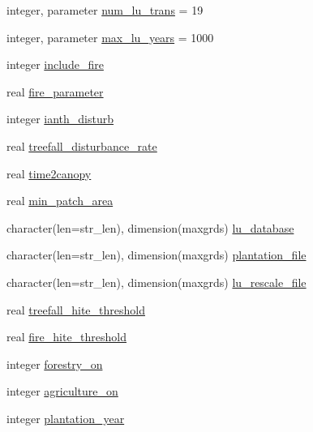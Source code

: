 \begin{DoxyCompactItemize}
\item 
integer, parameter \hyperlink{namespacedisturb__coms_ac39535da2e75c569a86d8f91379d75d9}{num\+\_\+lu\+\_\+trans} = 19
\item 
integer, parameter \hyperlink{namespacedisturb__coms_af76000b5f155f76ed0e8fd62ef9873e5}{max\+\_\+lu\+\_\+years} = 1000
\item 
integer \hyperlink{namespacedisturb__coms_a06107f7321a3d53a2c6c5d5accffdb86}{include\+\_\+fire}
\item 
real \hyperlink{namespacedisturb__coms_a2c64507b16785f128382bbaedda43397}{fire\+\_\+parameter}
\item 
integer \hyperlink{namespacedisturb__coms_af07d8f3335cce355394feb232ad87468}{ianth\+\_\+disturb}
\item 
real \hyperlink{namespacedisturb__coms_ab4604255008b23efcdf5edc4d3fbdabe}{treefall\+\_\+disturbance\+\_\+rate}
\item 
real \hyperlink{namespacedisturb__coms_abbe69bdb8568232491820307dfa0e8a2}{time2canopy}
\item 
real \hyperlink{namespacedisturb__coms_aae4a074357ca036d5e9c30996499aef1}{min\+\_\+patch\+\_\+area}
\item 
character(len=str\+\_\+len), dimension(maxgrds) \hyperlink{namespacedisturb__coms_accab313ae8921e27e72f8b4b78f9fc2b}{lu\+\_\+database}
\item 
character(len=str\+\_\+len), dimension(maxgrds) \hyperlink{namespacedisturb__coms_ac1b7ac7c81566618705267bc595476bf}{plantation\+\_\+file}
\item 
character(len=str\+\_\+len), dimension(maxgrds) \hyperlink{namespacedisturb__coms_ae23e33ce9008eba7d28598e7609b1ecd}{lu\+\_\+rescale\+\_\+file}
\item 
real \hyperlink{namespacedisturb__coms_a5073d33199400f190150b8f2d364bf72}{treefall\+\_\+hite\+\_\+threshold}
\item 
real \hyperlink{namespacedisturb__coms_afc2f848dc7eaa0f53d0b71df027ded1c}{fire\+\_\+hite\+\_\+threshold}
\item 
integer \hyperlink{namespacedisturb__coms_ad62faf6cb6e68427671e51537fb9ef1f}{forestry\+\_\+on}
\item 
integer \hyperlink{namespacedisturb__coms_a42942f09e1f80adbb629f5bc82d36127}{agriculture\+\_\+on}
\item 
integer \hyperlink{namespacedisturb__coms_af5965ee4c60a64646fdce9039c4e8aa8}{plantation\+\_\+year}
\item 

\end{DoxyCompactItemize}
